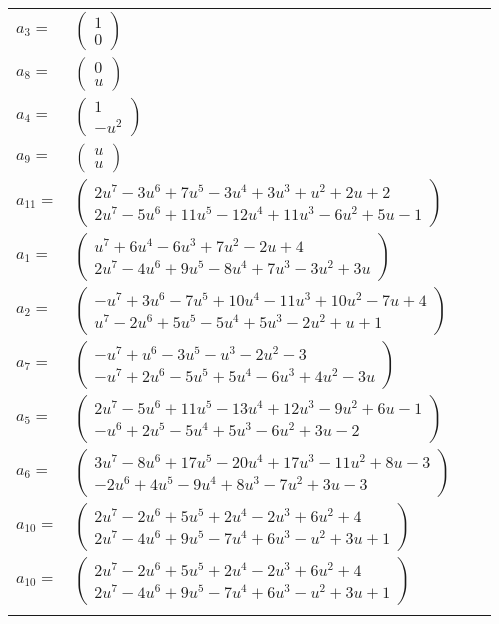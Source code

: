 \documentclass[1p]{elsarticle_modified}
\theoremstyle{definition}
\begin{document}
\begin{tabular}{m{7pt} m{180pt} m{7pt} m{180pt} }
\flushright $a_{3}=$&$\begin{pmatrix}1\\0\end{pmatrix}$ \\
\flushright $a_{8}=$&$\begin{pmatrix}0\\u\end{pmatrix}$ \\
\flushright $a_{4}=$&$\begin{pmatrix}1\\- u^2\end{pmatrix}$ \\
\flushright $a_{9}=$&$\begin{pmatrix}u\\u\end{pmatrix}$ \\
\flushright $a_{11}=$&$\begin{pmatrix}2 u^7-3 u^6+7 u^5-3 u^4+3 u^3+u^2+2 u+2\\2 u^7-5 u^6+11 u^5-12 u^4+11 u^3-6 u^2+5 u-1\end{pmatrix}$ \\
\flushright $a_{1}=$&$\begin{pmatrix}u^7+6 u^4-6 u^3+7 u^2-2 u+4\\2 u^7-4 u^6+9 u^5-8 u^4+7 u^3-3 u^2+3 u\end{pmatrix}$ \\
\flushright $a_{2}=$&$\begin{pmatrix}- u^7+3 u^6-7 u^5+10 u^4-11 u^3+10 u^2-7 u+4\\u^7-2 u^6+5 u^5-5 u^4+5 u^3-2 u^2+u+1\end{pmatrix}$ \\
\flushright $a_{7}=$&$\begin{pmatrix}- u^7+u^6-3 u^5- u^3-2 u^2-3\\- u^7+2 u^6-5 u^5+5 u^4-6 u^3+4 u^2-3 u\end{pmatrix}$ \\
\flushright $a_{5}=$&$\begin{pmatrix}2 u^7-5 u^6+11 u^5-13 u^4+12 u^3-9 u^2+6 u-1\\- u^6+2 u^5-5 u^4+5 u^3-6 u^2+3 u-2\end{pmatrix}$ \\
\flushright $a_{6}=$&$\begin{pmatrix}3 u^7-8 u^6+17 u^5-20 u^4+17 u^3-11 u^2+8 u-3\\-2 u^6+4 u^5-9 u^4+8 u^3-7 u^2+3 u-3\end{pmatrix}$ \\
\flushright $a_{10}=$&$\begin{pmatrix}2 u^7-2 u^6+5 u^5+2 u^4-2 u^3+6 u^2+4\\2 u^7-4 u^6+9 u^5-7 u^4+6 u^3- u^2+3 u+1\end{pmatrix}$\\ \flushright $a_{10}=$&$\begin{pmatrix}2 u^7-2 u^6+5 u^5+2 u^4-2 u^3+6 u^2+4\\2 u^7-4 u^6+9 u^5-7 u^4+6 u^3- u^2+3 u+1\end{pmatrix}$\\&\end{tabular}
\end{document}
